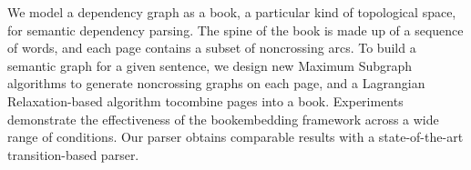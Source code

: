 We model a dependency graph as a book, a particular kind of topological space, for semantic dependency parsing. The spine of the book is made up of a sequence of words, and each page contains a subset of noncrossing arcs. To build a semantic graph for a given sentence, we design new Maximum Subgraph algorithms to generate noncrossing graphs on each page, and a Lagrangian Relaxation-based algorithm tocombine pages into a book. Experiments demonstrate the effectiveness of the bookembedding framework across a wide range of conditions. Our parser obtains comparable results with a state-of-the-art transition-based parser.
